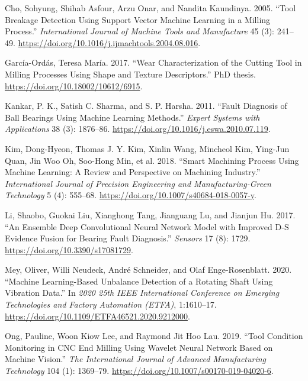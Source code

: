 \documentclass[
  letterpaper,
  DIV=11,
  numbers=noendperiod]{scrartcl}
\newlength{\cslhangindent}
\newenvironment{CSLReferences}[2] %
 {\begin{list}{}{%
  \setlength{\itemindent}{0pt}
  \setlength{\leftmargin}{0pt}
  \setlength{\parsep}{0pt}
  \ifodd #1
   \setlength{\leftmargin}{\cslhangindent}
   \setlength{\itemindent}{-1\cslhangindent}
  \fi
  \setlength{\itemsep}{#2\baselineskip}}}
 {\end{list}}
\begin{document}
\label{refs}
\begin{CSLReferences}{1}{0}
Cho, Sohyung, Shihab Asfour, Arzu Onar, and Nandita Kaundinya. 2005.
{``Tool Breakage Detection Using Support Vector Machine Learning in a
Milling Process.''} \emph{International Journal of Machine Tools and
Manufacture} 45 (3): 241--49.
\url{https://doi.org/10.1016/j.ijmachtools.2004.08.016}.

García-Ordás, Teresa María. 2017. {``Wear Characterization of the
Cutting Tool in Milling Processes Using Shape and Texture
Descriptors.''} PhD thesis. \url{https://doi.org/10.18002/10612/6915}.

Kankar, P. K., Satish C. Sharma, and S. P. Harsha. 2011. {``Fault
Diagnosis of Ball Bearings Using Machine Learning Methods.''}
\emph{Expert Systems with Applications} 38 (3): 1876--86.
\url{https://doi.org/10.1016/j.eswa.2010.07.119}.

Kim, Dong-Hyeon, Thomas J. Y. Kim, Xinlin Wang, Mincheol Kim, Ying-Jun
Quan, Jin Woo Oh, Soo-Hong Min, et al. 2018. {``Smart Machining Process
Using Machine Learning: A Review and Perspective on Machining
Industry.''} \emph{International Journal of Precision Engineering and
Manufacturing-Green Technology} 5 (4): 555--68.
\url{https://doi.org/10.1007/s40684-018-0057-y}.

Li, Shaobo, Guokai Liu, Xianghong Tang, Jianguang Lu, and Jianjun Hu.
2017. {``An {Ensemble} {Deep} {Convolutional} {Neural} {Network} {Model}
with {Improved} {D}-{S} {Evidence} {Fusion} for {Bearing} {Fault}
{Diagnosis}.''} \emph{Sensors} 17 (8): 1729.
\url{https://doi.org/10.3390/s17081729}.

Mey, Oliver, Willi Neudeck, André Schneider, and Olaf Enge-Rosenblatt.
2020. {``Machine {Learning}-{Based} {Unbalance} {Detection} of a
{Rotating} {Shaft} {Using} {Vibration} {Data}.''} In \emph{2020 25th
{IEEE} {International} {Conference} on {Emerging} {Technologies} and
{Factory} {Automation} ({ETFA})}, 1:1610--17.
\url{https://doi.org/10.1109/ETFA46521.2020.9212000}.

Ong, Pauline, Woon Kiow Lee, and Raymond Jit Hoo Lau. 2019. {``Tool
Condition Monitoring in {CNC} End Milling Using Wavelet Neural Network
Based on Machine Vision.''} \emph{The International Journal of Advanced
Manufacturing Technology} 104 (1): 1369--79.
\url{https://doi.org/10.1007/s00170-019-04020-6}.


\end{CSLReferences}
\end{document}

